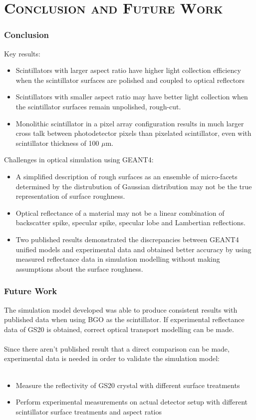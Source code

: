 \documentclass[xcolor=x11names, compress, handout]{beamer}
\renewcommand{\(}{\begin{columns}}
\renewcommand{\)}{\end{columns}}
\newcommand{\<}[1]{\begin{column}{#1}}
\renewcommand{\>}{\end{column}}
\begin{document}
\section{\scshape Conclusion and Future Work}
\begin{frame}
\frametitle{Conclusion}
\scriptsize
Key results:
\begin{itemize}
\item Scintillators with larger aspect ratio have higher light collection efficiency when the scintillator surfaces are polished and coupled to optical reflectors
\item Scintillators with smaller aspect ratio may have better light collection when the scintillator surfaces remain unpolished, rough-cut. 
\item Monolithic scintillator in a pixel array configuration results in much larger cross talk between photodetector pixels than pixelated scintillator, even with scintillator thickness of 100 $\mu$m.
\end{itemize}

Challenges in optical simulation using GEANT4:
\begin{itemize}
\item A simplified description of rough surfaces as an ensemble of micro-facets determined by the distrubution of Gaussian distribution may not be the true representation of surface roughness.
\item Optical reflectance of a material may not be a linear combination of backscatter spike, specular spike, specular lobe and Lambertian reflections. 
\item Two published results demonstrated the discrepancies between GEANT4 unified models and experimental data and obtained better accuracy by using measured reflectance data in simulation modelling without making assumptions about the surface roughness.
\end{itemize}
\end{frame}

\begin{frame}
\frametitle{Future Work}
\scriptsize
The simulation model developed was able to produce consistent results with published data when using BGO as the scintillator. If experimental reflectance data of GS20 is obtained, correct optical transport modelling can be made. \\
\ \\

Since there aren't published result that a direct comparison can be made, experimental data is needed in order to validate the simulation model: \\
\ \\
\begin{itemize}
  \item Measure the reflectivity of GS20 crystal with different surface treatments 
  \item Perform experimental measurements on actual detector setup with different scintillator surface treatments and aspect ratios
\end{itemize}

\vfill
\end{frame}
\end{document}
